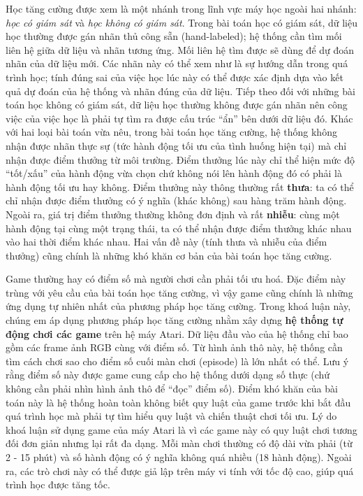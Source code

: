 Học tăng cường được xem là một nhánh trong lĩnh vực máy học ngoài hai nhánh: \textit{học có giám sát} và \textit{học không có giám sát}. 
Trong bài toán học có giám sát, dữ liệu học thường được gán nhãn thủ công sẵn (hand-labeled); hệ thống cần tìm mối liên hệ giữa dữ liệu và nhãn tương ứng.
Mối liên hệ tìm được sẽ dùng để dự đoán nhãn của dữ liệu mới.
Các nhãn này có thể xem như là sự hướng dẫn trong quá trình học; tính đúng sai của việc học lúc này có thể được xác định dựa vào kết quả dự đoán của hệ thống và nhãn đúng của dữ liệu. 
Tiếp theo đối với những bài toán học không có giám sát, dữ liệu học thường không được gán nhãn nên công việc của việc học là phải tự tìm ra được cấu trúc ``ẩn'' bên dưới dữ liệu đó. 
Khác với hai loại bài toán vừa nêu, trong bài toán học tăng cường, hệ thống không nhận được nhãn thực sự (tức hành động tối ưu của tình huống hiện tại) mà chỉ nhận được điểm thưởng từ môi trường. 
Điểm thưởng lúc này chỉ thể hiện mức độ ``tốt/xấu'' của hành động vừa chọn chứ không nói lên hành động đó có phải là hành động tối ưu hay không. 
Điểm thưởng này thông thường rất \textbf{thưa}: ta có thể chỉ nhận được điểm thưởng có ý nghĩa (khác không) sau hàng trăm hành động. 
Ngoài ra, giá trị điểm thưởng thường không đơn định và rất \textbf{nhiễu}: cùng một hành động tại cùng một trạng thái, ta có thể nhận được điểm thưởng khác nhau vào hai thời điểm khác nhau. 
Hai vấn đề này (tính thưa và nhiễu của điểm thưởng) cũng chính là những khó khăn cơ bản của bài toán học tăng cường.

Game thường hay có điểm số mà người chơi cần phải tối ưu hoá. 
Đặc điểm này trùng với yêu cầu của bài toán học tăng cường, vì vậy game cũng chính là những ứng dụng tự nhiên nhất của phương pháp học tăng cường. 
Trong khoá luận này, chúng em áp dụng phương pháp học tăng cường nhằm xây dựng \textbf{hệ thống tự động chơi các game} trên hệ máy Atari. 
Dữ liệu đầu vào của hệ thống chỉ bao gồm các frame ảnh RGB cùng với điểm số. 
Từ hình ảnh thô này, hệ thống cần tìm cách chơi sao cho điểm số cuối màn chơi (episode) là lớn nhất có thể.
Lưu ý rằng điểm số này được game cung cấp cho hệ thống dưới dạng số thực (chứ không cần phải nhìn hình ảnh thô để ``đọc'' điểm số).
Điểm khó khăn của bài toán này là hệ thống hoàn toàn không biết quy luật của game trước khi bắt đầu quá trình học mà phải tự tìm hiểu quy luật và chiến thuật chơi tối ưu. 
Lý do khoá luận sử dụng game của máy Atari là vì các game này có quy luật chơi tương đối đơn giản nhưng lại rất đa dạng. 
Mỗi màn chơi thường có độ dài vừa phải (từ 2 - 15 phút) và số hành động có ý nghĩa không quá nhiều (18 hành động). 
Ngoài ra, các trò chơi này có thể được giả lập trên máy vi tính với tốc độ cao, giúp quá trình học được tăng tốc.

